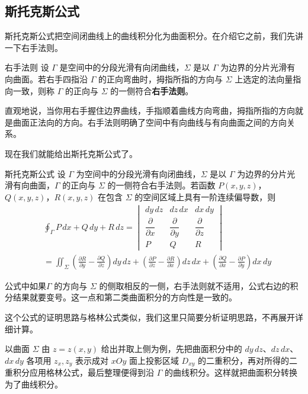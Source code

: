 \subsection{斯托克斯公式}
斯托克斯公式把空间闭曲线上的曲线积分化为曲面积分。在介绍它之前，我们先讲一下右手法则。
\begin{definition}{右手法则}{}
设 $\Gamma$ 是空间中的分段光滑有向闭曲线，$\Sigma$ 是以 $\Gamma$ 为边界的分片光滑有向曲面。若右手四指沿 $\Gamma$ 的正向弯曲时，拇指所指的方向与 $\Sigma$ 上选定的法向量指向一致，则称 $\Gamma$ 的正向与 $\Sigma$ 的一侧符合\textbf{右手法则}。
\end{definition}

直观地说，当你用右手握住边界曲线，手指顺着曲线方向弯曲，拇指所指的方向就是曲面正法向的方向。右手法则明确了空间中有向曲线与有向曲面之间的方向关系。

现在我们就能给出斯托克斯公式了。

\begin{theorem}{斯托克斯公式}{}
设 $\Gamma$ 为空间中的分段光滑有向闭曲线，$\Sigma$ 是以 $\Gamma$ 为边界的分片光滑有向曲面，$\Gamma$ 的正向与 $\Sigma$ 的一侧符合右手法则。若函数 $P(x,y,z)$，$Q(x,y,z)$，$R(x,y,z)$ 在包含 $\Sigma$ 的空间区域上具有一阶连续偏导数，则
\[
\begin{aligned}
    &\oint_{\Gamma} P\,dx + Q\,dy + R\,dz
    =
    \begin{vmatrix}
    dy\,dz & dz\,dx & dx\,dy \\[4pt]
    \dfrac{\partial}{\partial x} & \dfrac{\partial}{\partial y} & \dfrac{\partial}{\partial z} \\[6pt]
    P & Q & R
    \end{vmatrix}\\
    &=
    \iint_{\Sigma}
    \left(\frac{\partial R}{\partial y}-\frac{\partial Q}{\partial z}\right)dy\,dz
    +\left(\frac{\partial P}{\partial z}-\frac{\partial R}{\partial x}\right)dz\,dx
    +\left(\frac{\partial Q}{\partial x}-\frac{\partial P}{\partial y}\right)dx\,dy
\end{aligned}
\]
\end{theorem}

公式中如果$\Gamma$ 的方向与 $\Sigma$ 的侧取相反的一侧，右手法则就不适用，公式右边的积分结果就要变号。这一点和第二类曲面积分的方向性是一致的。

这个公式的证明思路与格林公式类似，我们这里只简要分析证明思路，不再展开详细计算。

以曲面 $\Sigma$ 由 $z=z(x,y)$ 给出并取上侧为例，先把曲面积分中的 $dy\,dz$、$dz\,dx$、$dx\,dy$ 各项用 $z_x,z_y$ 表示成对 $xOy$ 面上投影区域 $D_{xy}$ 的二重积分，再对所得的二重积分应用格林公式，最后整理便得到沿 $\Gamma$ 的曲线积分。这样就把曲面积分转换为了曲线积分。

